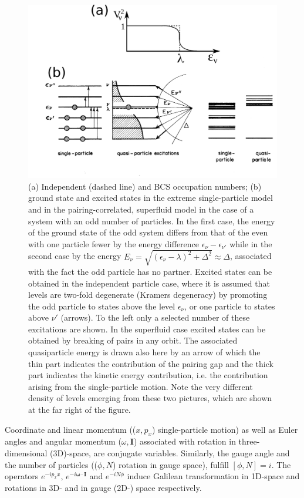 \begin{figure}
	\centerline {
		\includegraphics*[width=15cm, angle=0.]{introduccion/figs/fig0_4_4_v2}
	}
	\caption{(a) Independent (dashed line) and BCS occupation numbers; (b) ground state and excited states in the extreme single-particle model and in the pairing-correlated, superfluid model in the case of a system with an odd number of particles. In the first case, the energy of the ground state of the odd system differs from that of the even with one particle fewer by the energy difference $\epsilon_\nu-\epsilon_{\nu'}$ while in the second case by the energy $E_\nu=\sqrt{(\epsilon_\nu-\lambda)^2+\Delta^2}\approx\Delta$, associated with the fact the odd particle has no partner. Excited states can be obtained in the independent particle case, where it is assumed that levels are two-fold degenerate (Kramers degeneracy) by promoting the odd particle to states above the level $\epsilon_\nu$, or one particle to  states above  $\nu'$ (arrows). To the left only a selected number of these excitations are shown. In the superfluid case excited states can be obtained by breaking of pairs in any orbit. The associated quasiparticle energy is drawn also here by an arrow of which the thin part indicates the contribution of the pairing gap and the thick part indicates the kinetic energy contribution, i.e. the contribution arising from the single-particle motion. Note the very different density of levels emerging from these two pictures, which are shown at the far right of the figure.}
	\label{fig0.4.3}
\end{figure}

Coordinate and linear momentum (($x,p_x$) single-particle motion) as well as Euler angles and angular momentum ($\omega,\mathbf I$) associated with rotation in three-dimensional (3D)-space,  are conjugate variables. Similarly, the gauge angle and the number of particles (($\phi,N$) rotation in gauge space), fulfill $[\phi,N]=i$. The operators $e^{-ip_xx}$, $e^{-i\pmb\omega\cdot\mathbf I}$ and $e^{-iN\phi}$ induce Galilean transformation in 1D-space and rotations in 3D- and in gauge (2D-) space respectively. 

